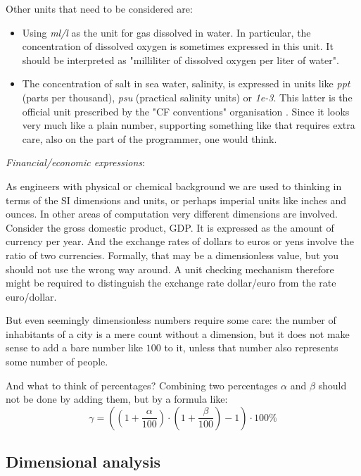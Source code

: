 \documentclass{article}
\begin{document}
Other units that need to be considered are:
\begin{itemize}
\item
Using \emph{ml/l} as the unit for gas dissolved in water. In particular, the concentration of dissolved oxygen is
sometimes expressed in this unit. It should be interpreted as "milliliter of dissolved oxygen per liter of water".
\item
The concentration of salt in sea water, salinity, is expressed in units like \emph{ppt} (parts per thousand), \emph{psu}
(practical salinity units) or \emph{1e-3}. This latter is the official unit prescribed by the "CF conventions" organisation
\cite{CFConventionsStandardNames}.
Since it looks very much like a plain number, supporting something like that requires extra care, also on the part of
the programmer, one would think.
\end{itemize}

\vspace{\baselineskip}
\noindent \emph{Financial/economic expressions}:

\noindent As engineers with physical or chemical background we are used to thinking in terms of the SI dimensions and units, or
perhaps imperial units like inches and ounces. In other areas of computation very different dimensions are involved.
Consider the gross domestic product, GDP. It is expressed as the amount of currency per year. And the
exchange rates of dollars to euros or yens involve the ratio of two currencies. Formally, that may be a dimensionless
value, but you should not use the wrong way around. A unit checking mechanism therefore might be required to
distinguish the exchange rate dollar/euro from the rate euro/dollar.

But even seemingly dimensionless numbers require some care: the number of inhabitants of a city is a mere count without
a dimension, but it does not make sense to add a bare number like $100$ to it, unless that number also represents some
number of people.

And what to think of percentages? Combining two percentages $\alpha$ and $\beta$ should not be done by adding them, but by
a formula like:
\begin{equation}
    \gamma = ((1 + \frac{\alpha}{100}) \cdot (1 + \frac{\beta}{100}) - 1) \cdot 100\%
\end{equation}

\subsection*{Dimensional analysis}
\end{document}
